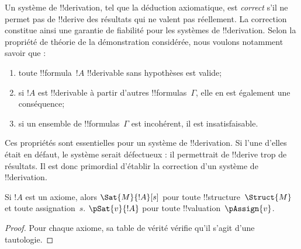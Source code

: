 \documentclass[../../../include/open-logic-section]{subfiles}
\begin{document}
      {}
      {}


\begin{explain}
Un système de !!{derivation}, tel que la déduction axiomatique, est
\emph{correct} s'il ne permet pas de !!{derive} des résultats qui ne
valent pas réellement. La correction constitue ainsi une garantie de
fiabilité pour les systèmes de !!{derivation}. Selon la propriété de
théorie de la démonstration considérée, nous voulons notamment savoir
que :
\begin{enumerate}
\item toute !!{formula}~$!A$ !!{derivable} sans hypothèses est valide;
\item si $!A$ est !!{derivable} à partir d'autres !!{formula}s~$\Gamma$,
  elle en est également une conséquence;
\item si un ensemble de !!{formula}s~$\Gamma$ est incohérent, il est
  insatisfaisable.
\end{enumerate}
Ces propriétés sont essentielles pour un système de !!{derivation}.
Si l'une d'elles était en défaut, le système serait défectueux : il
permettrait de !!{derive} trop de résultats. Il est donc primordial
d'établir la correction d'un système de !!{derivation}.
\end{explain}

\begin{prop}
Si $!A$ est un axiome, alors
  {$\Sat{M}{!A}[s]$ pour toute !!{structure}~$\Struct{M}$ et toute
    assignation~$s$.}
  {$\pSat{v}{!A}$ pour toute !!{valuation}~$\pAssign{v}$.}
\end{prop}

\begin{proof}
  {Pour chaque axiome, sa table de vérité vérifie qu'il s'agit d'une
  tautologie.}
\end{proof}
\end{document}
